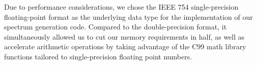 Due to performance considerations, we chose the IEEE 754 single-precision
floating-point format \citep{IEEE:754} as the underlying data type for
the implementation of our spectrum generation code. Compared to the
double-precision format, it simultaneously allowed us to cut our memory
requirements in half, as well as accelerate arithmetic operations by taking
advantage of the C99 \citep{C99} math library functions tailored to
single-precision floating point numbers.
%
%


